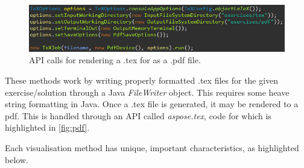 \documentclass{l4proj}
\begin{document}
\begin{figure}
    \centering
    \includegraphics[width=0.99\linewidth]{images/pdf.png}    

    \caption{API calls for rendering a .tex for as a .pdf file.}
    \label{fig:pdf} 
\end{figure}

These methods work by writing properly formatted .tex files for the given exercise/solution through a Java \emph{FileWriter} object. This requires some heave string formatting in Java. Once a .tex file is generated, it may be rendered to a pdf. This is handled through an API called \emph{aspose.tex}, code for which is highlighted in \autoref{fig:pdf}.

Each visualisation method has unique, important characteristics, as highlighted below.
\end{document}
